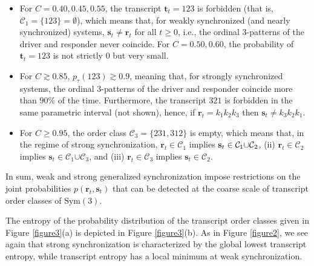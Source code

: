 \documentclass[%
 aip,
 amsmath,amssymb,
 reprint,%
]{revtex4-1}
\begin{document}
\begin{itemize}
\item For $C=0.40,0.45,0.55$, the transcript $\mathbf{t}_{t}=123$ is
forbidden (that is, $\mathcal{C}_{1}=\{123\}=\emptyset $), which means that,
for weakly synchronized (and nearly synchronized) systems, $\mathbf{s}%
_{t}\neq \mathbf{r}_{t}$ for all $t\geq 0$, i.e., the ordinal $3$-patterns
of the driver and responder never coincide. For $C=0.50,0.60$, the
probability of $\mathbf{t}_{t}=123$ is not strictly $0$ but very small.

\item For $C\gtrsim 0.85$, $p_{\tau }(123)\gtrsim 0.9$, meaning that, for
strongly synchronized systems, the ordinal $3$-patterns of the driver and
responder coincide more than $90\%$ of the time. Furthermore, the transcript 
$321$ is forbidden in the same parametric interval (not shown), hence, if $%
\mathbf{r}_{t}=k_{1}k_{2}k_{3}$ then $\mathbf{s}_{t}\neq k_{3}k_{2}k_{1}$.

\item For $C\geq 0.95$, the order class $\mathcal{C}_{3}=\{231,312\}$ is
empty, which means that, in the regime of strong synchronization, $\mathbf{r}%
_{t}\in \mathcal{C}_{1}$ implies $\mathbf{s}_{t}\in \mathcal{C}_{1}\mathcal{%
\cup C}_{2}$, (ii) $\mathbf{r}_{t}\in \mathcal{C}_{2}$ implies $\mathbf{s}%
_{t}\in \mathcal{C}_{1}\mathcal{\cup C}_{3}$, and (iii) $\mathbf{r}_{t}\in 
\mathcal{C}_{3}$ implies $\mathbf{s}_{t}\in \mathcal{C}_{2}$.
\end{itemize}

In sum, weak and strong generalized synchronization impose restrictions on
the joint probabilities $p(\mathbf{r}_{t},\mathbf{s}_{t})$ that can be
detected at the coarse scale of transcript order classes of $\textrm{Sym}(3)$.

The entropy of the probability distribution of the transcript order classes
given in Figure \ref{figure3}(a) is depicted in Figure \ref{figure3}(b). As
in Figure \ref{figure2}, we see again that strong synchronization is
characterized by the global lowest transcript entropy, while transcript entropy has a local minimum at weak synchronization.
\end{document}
